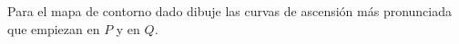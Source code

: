 \item Para el mapa de contorno dado dibuje las curvas de ascensión más pronunciada que empiezan en $P$ y en $Q$.
